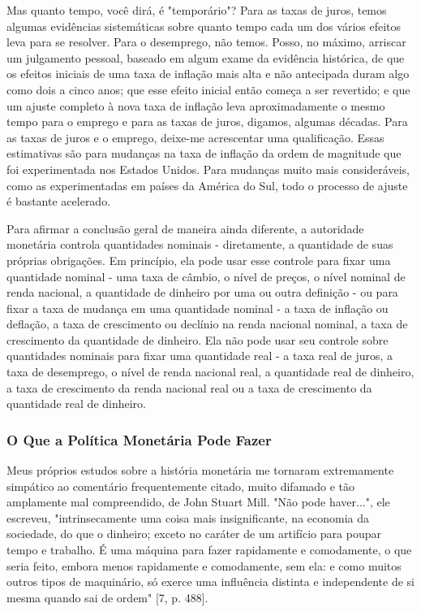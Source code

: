 \documentclass[a4paper,12pt]{article}[abntex2]
\begin{document}
Mas quanto tempo, você dirá, é "temporário"? Para as taxas de juros, temos algumas evidências sistemáticas sobre quanto tempo cada um dos vários efeitos leva para se resolver. Para o desemprego, não temos. Posso, no máximo, arriscar um julgamento pessoal, baseado em algum exame da evidência histórica, de que os efeitos iniciais de uma taxa de inflação mais alta e não antecipada duram algo como dois a cinco anos; que esse efeito inicial então começa a ser revertido; e que um ajuste completo à nova taxa de inflação leva aproximadamente o mesmo tempo para o emprego e para as taxas de juros, digamos, algumas décadas. Para as taxas de juros e o emprego, deixe-me acrescentar uma qualificação. Essas estimativas são para mudanças na taxa de inflação da ordem de magnitude que foi experimentada nos Estados Unidos. Para mudanças muito mais consideráveis, como as experimentadas em países da América do Sul, todo o processo de ajuste é bastante acelerado.

Para afirmar a conclusão geral de maneira ainda diferente, a autoridade monetária controla quantidades nominais - diretamente, a quantidade de suas próprias obrigações. Em princípio, ela pode usar esse controle para fixar uma quantidade nominal - uma taxa de câmbio, o nível de preços, o nível nominal de renda nacional, a quantidade de dinheiro por uma ou outra definição - ou para fixar a taxa de mudança em uma quantidade nominal - a taxa de inflação ou deflação, a taxa de crescimento ou declínio na renda nacional nominal, a taxa de crescimento da quantidade de dinheiro. Ela não pode usar seu controle sobre quantidades nominais para fixar uma quantidade real - a taxa real de juros, a taxa de desemprego, o nível de renda nacional real, a quantidade real de dinheiro, a taxa de crescimento da renda nacional real ou a taxa de crescimento da quantidade real de dinheiro.

\subsubsection{\textbf{O Que a Política Monetária Pode Fazer}}

Meus próprios estudos sobre a história monetária me tornaram extremamente simpático ao comentário frequentemente citado, muito difamado e tão amplamente mal compreendido, de John Stuart Mill. "Não pode haver...", ele escreveu, "intrinsecamente uma coisa mais insignificante, na economia da sociedade, do que o dinheiro; exceto no caráter de um artifício para poupar tempo e trabalho. É uma máquina para fazer rapidamente e comodamente, o que seria feito, embora menos rapidamente e comodamente, sem ela: e como muitos outros tipos de maquinário, só exerce uma influência distinta e independente de si mesma quando sai de ordem" [7, p. 488].
\end{document}
